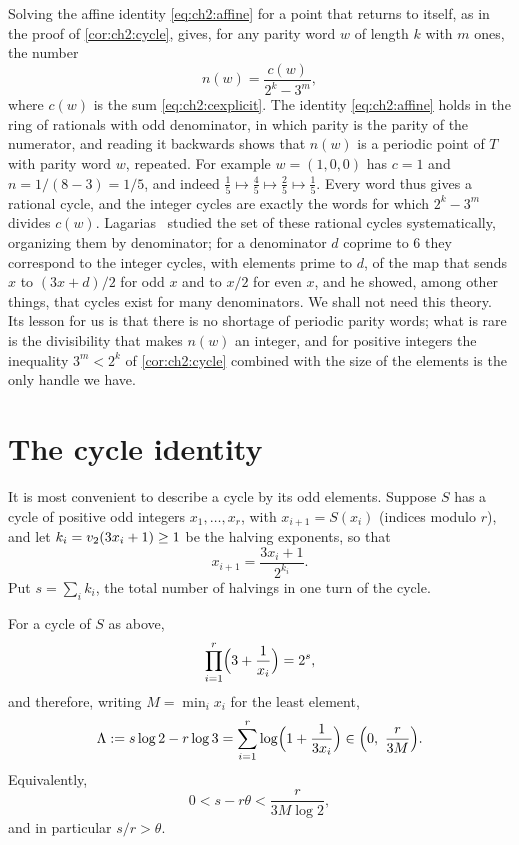 Solving the affine identity \eqref{eq:ch2:affine} for a point that returns to itself, as in the proof of \cref{cor:ch2:cycle}, gives, for any parity word $w$ of length $k$ with $m$
ones, the number
\[
  n(w)=\frac{c(w)}{2^k-3^m},
\]
where $c(w)$ is the sum \eqref{eq:ch2:cexplicit}. The identity
\eqref{eq:ch2:affine} holds in the ring of rationals with odd denominator,
in which parity is the parity of the numerator, and reading it backwards shows
that $n(w)$ is a periodic point of $T$ with parity word $w$, repeated. For
example $w=(1,0,0)$ has $c=1$ and $n=1/(8-3)=1/5$, and indeed
$\tfrac15\mapsto\tfrac45\mapsto\tfrac25\mapsto\tfrac15$. Every word thus gives
a rational cycle, and the integer cycles are exactly the words for which
$2^k-3^m$ divides $c(w)$. Lagarias~\cite{lagarias1990} studied the set of
these rational cycles systematically, organizing them by denominator; for a
denominator $d$ coprime to $6$ they correspond to the integer cycles, with elements prime to $d$, of the map that sends $x$ to $(3x+d)/2$ for odd $x$ and to $x/2$ for even $x$, and he showed, among other things, that cycles exist for many denominators. We shall not need this theory. Its lesson for us is that
there is no shortage of periodic parity words; what is rare is the
divisibility that makes $n(w)$ an integer, and for positive integers the
inequality $3^m<2^k$ of \cref{cor:ch2:cycle} combined with the size of the
elements is the only handle we have.

\section{The cycle identity}\label{sec:ch8:identity}

It is most convenient to describe a cycle by its odd elements. Suppose $S$ has
a cycle of positive odd integers $x_1,\dots,x_r$, with $x_{i+1}=S(x_i)$
(indices modulo $r$), and let $k_i=v_2(3x_i+1)\geq1$ be the halving exponents,
so that
\begin{equation}\label{eq:ch8:stride}
  x_{i+1}=\frac{3x_i+1}{2^{k_i}} .
\end{equation}
Put $s=\sum_i k_i$, the total number of halvings in one turn of the cycle.

\begin{lemma}\label{lem:cycleid}
For a cycle of $S$ as above,
\begin{equation}\label{eq:ch8:prod}
  \prod_{i=1}^{r}\Bigl(3+\frac{1}{x_i}\Bigr)=2^{s},
\end{equation}
and therefore, writing $M=\min_i x_i$ for the least element,
\begin{equation}\label{eq:ch8:Lambda}
  \Lambda:=s\log2-r\log3=\sum_{i=1}^{r}\log\Bigl(1+\frac{1}{3x_i}\Bigr)
  \in\Bigl(0,\ \frac{r}{3M}\Bigr).
\end{equation}
Equivalently,
\begin{equation}\label{eq:ch8:theta}
  0<s-r\theta<\frac{r}{3M\log2},
\end{equation}
and in particular $s/r>\theta$.
\end{lemma}

